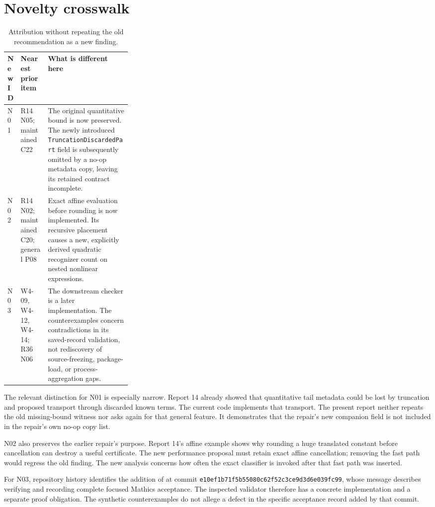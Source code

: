 \documentclass[11pt,letterpaper]{article}
\newcommand{\prop}[1]{\texttt{#1}}
\begin{document}
\section{Novelty crosswalk}
\label{sec:novelty}

\begin{table}[htbp]
\small
\begin{tabularx}{\linewidth}{@{}p{0.07\linewidth}p{0.22\linewidth}Y@{}}
\toprule
New ID & Nearest prior item & What is different here \\
\midrule
N01 & R14 N05; maintained C22 & The original quantitative bound is now preserved.
The newly introduced \prop{TruncationDiscardedPart} field is subsequently omitted
by a no-op metadata copy, leaving its retained contract incomplete. \\
N02 & R14 N02; maintained C20; general P08 & Exact affine evaluation before rounding
is now implemented. Its recursive placement causes a new, explicitly derived
quadratic recognizer count on nested nonlinear expressions. \\
N03 & W4-09, W4-12, W4-14; R36 N06 & The downstream checker is a later implementation.
The counterexamples concern contradictions in its saved-record validation, not
rediscovery of source-freezing, package-load, or process-aggregation gaps. \\
\bottomrule
\end{tabularx}
\caption{Attribution without repeating the old recommendation as a new finding.}
\end{table}

The relevant distinction for N01 is especially narrow. Report 14 already showed
that quantitative tail metadata could be lost by truncation and proposed
transport through discarded known terms. The current code implements that
transport. The present report neither repeats the old missing-bound witness nor
asks again for that general feature. It demonstrates that the repair's new
companion field is not included in the repair's own no-op copy list.
\cite{r14,operations,status}

N02 also preserves the earlier repair's purpose. Report 14's affine example shows
why rounding a huge translated constant before cancellation can destroy a useful
certificate. The new performance proposal must retain exact affine cancellation;
removing the fast path would regress the old finding. The new analysis concerns
how often the exact classifier is invoked after that fast path was inserted.
\cite{r14,certificates}

For N03, repository history identifies the addition of
 at commit
\texttt{e10ef1b71f5b55080c62f52c3ce9d3d6e039fc99}, whose message describes
verifying and recording complete focused Mathics acceptance. The inspected
validator therefore has a concrete implementation and a separate proof obligation.
The synthetic counterexamples do not allege a defect in the specific acceptance
record added by that commit.\cite{checker,checkercommit}
\end{document}
